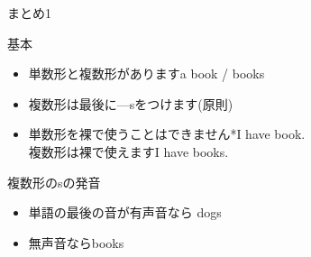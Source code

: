 \documentclass[aspectratio=169,xcolor={dvipsnames,table}]{beamer}
\begin{document}
\begin{frame}[plain]{まとめ1}
 \begin{block}{基本}\small
\begin{itemize}[square]
 \item  単数形と複数形があります\hfill{}a book / books
 \item 複数形は最後に---sをつけます(原則)
 \item  単数形を裸で使うことはできません\hfill{}*I have book.\,\,\dbend\\
複数形は裸で使えます\hfill{}I have books.\,\phantom{\dbend}\mbox{}
\end{itemize}
      \end{block}

\pause

\begin{block}{複数形のsの発音}\small
\begin{itemize}[square]
 \item 単語の最後の音が有声音なら\,\,\dbend\hfill{}dogs 
 \item \phantom{単語の最後の音が}無声音なら\hfill{}books 
\end{itemize}
\end{block}
\end{frame}
\end{document}
